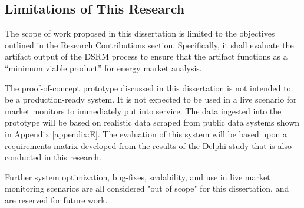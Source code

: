 \subsection{Limitations of This Research}

The scope of work proposed in this dissertation is limited to the objectives outlined in the Research Contributions section. Specifically, it shall evaluate the artifact output of the DSRM process to ensure that the artifact functions as a “minimum viable product” for energy market analysis.

The proof-of-concept prototype discussed in this dissertation is not intended to be a production-ready system. It is not expected to be used in a live scenario for market monitors to immediately put into service. The data ingested into the prototype will be based on realistic data scraped from public data systems shown in Appendix \ref{appendix:E}. The evaluation of this system will be based upon a requirements matrix developed from the results of the Delphi study that is also conducted in this research.

Further system optimization, bug-fixes, scalability, and use in live market monitoring scenarios are all considered "out of scope" for this dissertation, and are reserved for future work.